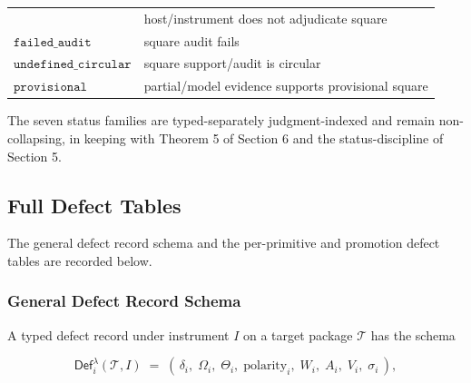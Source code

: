 \documentclass[11pt]{article}
\theoremstyle{definition}
\begin{document}
\begin{longtable}[]{@{}ll@{}}
\begin{minipage}[t]{0.28\columnwidth}
\end{minipage} & \begin{minipage}[t]{0.66\columnwidth}\raggedright
host/instrument does not adjudicate square\strut
\end{minipage}\tabularnewline
\begin{minipage}[t]{0.28\columnwidth}\raggedright
\(\texttt{failed\_audit}\)\strut
\end{minipage} & \begin{minipage}[t]{0.66\columnwidth}\raggedright
square audit fails\strut
\end{minipage}\tabularnewline
\begin{minipage}[t]{0.28\columnwidth}\raggedright
\(\texttt{undefined\_circular}\)\strut
\end{minipage} & \begin{minipage}[t]{0.66\columnwidth}\raggedright
square support/audit is circular\strut
\end{minipage}\tabularnewline
\begin{minipage}[t]{0.28\columnwidth}\raggedright
\(\texttt{provisional}\)\strut
\end{minipage} & \begin{minipage}[t]{0.66\columnwidth}\raggedright
partial/model evidence supports provisional square\strut
\end{minipage}\tabularnewline
\bottomrule
\end{longtable}

The seven status families are typed-separately judgment-indexed and remain non-collapsing, in keeping with Theorem 5 of Section 6 and the status-discipline of Section 5.

\subsection{Full Defect Tables}

The general defect record schema and the per-primitive and promotion defect tables are recorded below.

\subsubsection{General Defect Record Schema}

A typed defect record under instrument \(I\) on a target package \(\mathcal T\) has the schema

\[
\mathsf{Def}_{i}^{\lambda}(\mathcal T,I)\;=\;(\,\delta_{i},\;\Omega_{i},\;\Theta_{i},\;\mathrm{polarity}_{i},\;W_{i},\;A_{i},\;V_{i},\;\sigma_{i}\,),
\]
\end{document}
